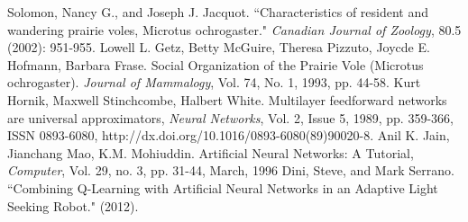\documentclass[10pt,conference,letterpaper,doublecolumn]{IEEEtran}
\begin{document}

\begin{thebibliography}{10}

 Solomon, Nancy G., and Joseph J. Jacquot. ``Characteristics of resident and wandering prairie voles, Microtus ochrogaster." \textit{Canadian Journal of Zoology}, 80.5 (2002): 951-955.
 Lowell L. Getz, Betty McGuire, Theresa Pizzuto, Joycde E. Hofmann, Barbara Frase. Social Organization of the Prairie Vole (Microtus ochrogaster). \textit{Journal of Mammalogy}, Vol. 74, No. 1, 1993, pp. 44-58.
 Kurt Hornik, Maxwell Stinchcombe, Halbert White. Multilayer feedforward networks are universal approximators, \textit{Neural Networks}, Vol. 2, Issue 5, 1989, pp. 359-366, ISSN 0893-6080, http://dx.doi.org/10.1016/0893-6080(89)90020-8.
 Anil K. Jain, Jianchang Mao, K.M. Mohiuddin. Artificial Neural Networks: A Tutorial, \textit{Computer}, Vol. 29, no. 3, pp. 31-44, March, 1996
 Dini, Steve, and Mark Serrano. ``Combining Q-Learning with Artificial Neural Networks in an Adaptive Light Seeking Robot." (2012).

\end{thebibliography} 
\end{document}
